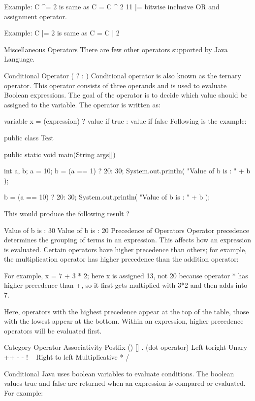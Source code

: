 Example: C ^= 2 is same as C = C ^ 2 11 |= bitwise inclusive OR and assignment operator.

Example: C |= 2 is same as C = C | 2

Miscellaneous Operators
There are few other operators supported by Java Language.

Conditional Operator ( ? : ) Conditional operator is also known as the ternary operator. This operator consists of three operands and is used to evaluate Boolean expressions. The goal of the operator is to decide which value should be assigned to the variable. The operator is written as:

variable x = (expression) ? value if true : value if false
Following is the example:

public class Test {

   public static void main(String args[]){
      int a, b;
      a = 10;
      b = (a == 1) ? 20: 30;
      System.out.println( "Value of b is : " +  b );

      b = (a == 10) ? 20: 30;
      System.out.println( "Value of b is : " + b );
   }
}
This would produce the following result ?

Value of b is : 30
Value of b is : 20
Precedence of Operators
Operator precedence determines the grouping of terms in an expression. This affects how an expression is evaluated. Certain operators have higher precedence than others; for example, the multiplication operator has higher precedence than the addition operator:

For example, x = 7 + 3 * 2; here x is assigned 13, not 20 because operator * has higher precedence than +, so it first gets multiplied with 3*2 and then adds into 7.

Here, operators with the highest precedence appear at the top of the table, those with the lowest appear at the bottom. Within an expression, higher precedence operators will be evaluated first.

Category Operator Associativity Postfix () [] . (dot operator) Left toright Unary ++ - - ! ~ Right to left Multiplicative * / %

Conditional
Java uses boolean variables to evaluate conditions. The boolean values true and false are returned when an expression is compared or evaluated. For example:


